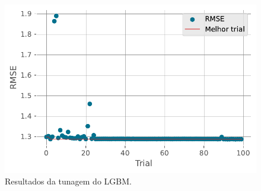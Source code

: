 \documentclass[
  12pt,
  a4paper,
]{scrreprt}
\begin{document}
\begin{figure}
\begin{minipage}{0.33\linewidth}
{\captionsetup{labelsep=none}\includegraphics{TCC_files/figure-pdf/fig-lgbm_history-output-1.pdf}

}

\subcaption{\label{fig-lgbm_history}}

\end{minipage}%
\newline
\begin{minipage}{\linewidth}


\subcaption{\label{fig-lgbm_contour}}

\end{minipage}%

\caption{\label{fig-lgbm_param}Resultados da tunagem do LGBM.}

\end{figure}%
\end{document}
